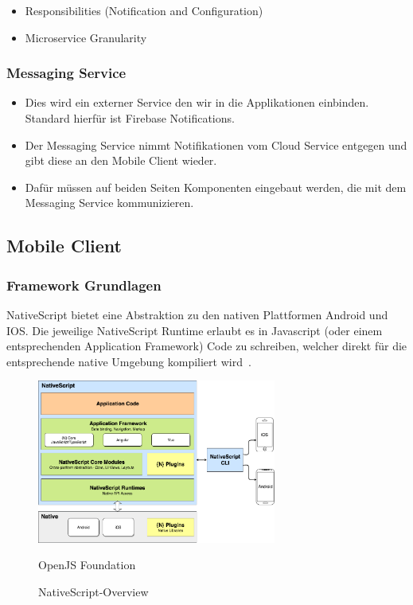 \begin{itemize}
    \item Responsibilities (Notification and Configuration)
    \item Microservice Granularity
\end{itemize}


\subsubsection*{Messaging Service}

\begin{itemize}
    \item Dies wird ein externer Service den wir in die Applikationen einbinden. Standard hierfür ist Firebase Notifications.
    \item Der Messaging Service nimmt Notifikationen vom Cloud Service entgegen und gibt diese an den Mobile Client wieder.
    \item Dafür müssen auf beiden Seiten Komponenten eingebaut werden, die mit dem Messaging Service kommunizieren.
\end{itemize}

\clearpage

\subsection{Mobile Client}\label{subsec:mobile-client}

\subsubsection{Framework Grundlagen}
NativeScript bietet eine Abstraktion zu den nativen Plattformen Android und IOS.
Die jeweilige NativeScript Runtime erlaubt es in Javascript (oder einem entsprechenden Application Framework) Code zu schreiben,
welcher direkt für die entsprechende native Umgebung kompiliert wird~\cite{ns-core-overview}.
\begin{figure}[h]
    \centering
    \label{fig:howNSWorks}
    \includegraphics[width=0.7\textwidth]{graphics/ns-common}\caption[NativeScript-Overview]{NativeScript-Overview}\textcopyright OpenJS Foundation
\end{figure}


